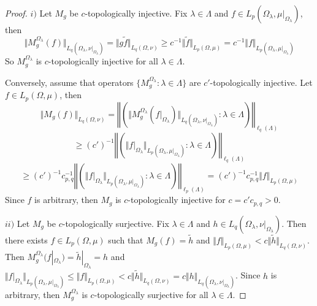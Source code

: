 \begin{proof}
$i)$ Let $M_g$ be $c$-topologically injective. Fix $\lambda\in\Lambda$ and $f\in L_p(\Omega_\lambda,\mu|_{\Omega_\lambda})$, then 
$$
\Vert M_g^{\Omega_\lambda}(f)\Vert_{L_q(\Omega_\lambda,\nu|_{\Omega_\lambda})}
=\Vert g \widetilde{f}\Vert_{L_q(\Omega,\nu)}
\geq c^{-1}\Vert\widetilde{f}\Vert_{L_p(\Omega,\mu)}
=c^{-1}\Vert f\Vert_{L_p(\Omega_\lambda,\mu|_{\Omega_\lambda})}
$$
So $M_g^{\Omega_\lambda}$ is $c$-topologically injective for all $\lambda\in\Lambda$. 

Conversely, assume that operators $\{M_g^{\Omega_\lambda}:\lambda\in\Lambda\}$ are $c'$-topologically injective. Let $f\in L_p(\Omega,\mu)$, then 
$$
\Vert M_g(f)\Vert_{L_q(\Omega,\nu)}
=\left\Vert\left(\Vert M_g^{\Omega_\lambda}(f|_{\Omega_\lambda})\Vert_{L_q(\Omega_\lambda,\nu|_{\Omega_\lambda})}:\lambda\in\Lambda\right)\right\Vert_{\ell_q(\Lambda)}
$$
$$
\geq (c')^{-1}\left\Vert\left(\Vert f|_{\Omega_\lambda}\Vert_{L_p(\Omega_\lambda,\mu|_{\Omega_\lambda})}:\lambda\in\Lambda\right)\right\Vert_{\ell_q(\Lambda)}
$$
$$
\geq (c')^{-1} c_{p,q}^{-1}\left\Vert\left(\Vert f|_{\Omega_\lambda}\Vert_{L_p(\Omega_\lambda,\mu|_{\Omega_\lambda})}:\lambda\in\Lambda\right)\right\Vert_{\ell_p(\Lambda)}
=(c')^{-1}c_{p,q}^{-1}\Vert f\Vert_{L_p(\Omega,\mu)}
$$
Since $f$ is arbitrary, then $M_g$ is $c$-topologically injective for $c=c'c_{p,q}>0$.

$ii)$ Let $M_g$ be $c$-topologically surjective. Fix $\lambda\in\Lambda$ and $h\in L_q(\Omega_\lambda,\nu|_{\Omega_\lambda})$. Then there exists $f\in L_p(\Omega,\mu)$ such that $M_g(f)=\widetilde{h}$ and $\Vert f\Vert_{L_p(\Omega,\mu)}< c\Vert \widetilde{h}\Vert_{L_q(\Omega,\nu)}$. Then $M_g^{\Omega_\lambda}(f|_{\Omega_\lambda})=\widetilde{h}|_{\Omega_\lambda}=h$ and $\Vert f|_{\Omega_\lambda}\Vert_{L_p(\Omega_\lambda,\mu|_{\Omega_\lambda})}\leq \Vert f\Vert_{L_p(\Omega,\mu)}< c\Vert\widetilde{h}\Vert_{L_q(\Omega,\nu)}=c\Vert h\Vert_{L_q(\Omega_\lambda,\nu|_{\Omega_\lambda})}$. Since $h$ is arbitrary, then $M_g^{\Omega_\lambda}$ is $c$-topologically surjective for all $\lambda\in\Lambda$.


\end{proof}
